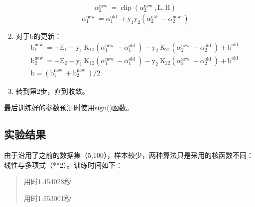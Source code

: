\documentclass[UTF8,a4paper,AutoFakeBold,AutoFakeSlant]{article}
\begin{document}
\begin{enumerate}
\begin{equation*}
\begin{array}{c}
      \alpha_{2}^{\text {new }}=\operatorname{clip}\left(\alpha_{2}^{\text {new }}, \mathrm{L}, \mathrm{H}\right)
      \end{array}
  \end{equation*}
  \begin{equation*}
    \alpha_{1}^{\text {new }}=\alpha_{1}^{\text {old }}+\mathrm{y}_{1} \mathrm{y}_{2}\left(\alpha_{2}^{\text {old }}-\alpha_{2}^{\text {new }}\right)
  \end{equation*}
  \item 对于b的更新：
  \begin{equation*}
    \begin{array}{c}
      \mathrm{b}_{1}^{\text {new }}=-\mathrm{E}_{1}-\mathrm{y}_{1} \mathrm{~K}_{11}\left(\alpha_{1}^{\text {new }}-\alpha_{1}^{\text {old }}\right)-\mathrm{y}_{2} \mathrm{~K}_{21}\left(\alpha_{2}^{\text {new }}-\alpha_{2}^{\text {old }}\right)+\mathrm{b}^{\text {old }} \\
      \mathrm{b}_{2}^{\text {new }}=-\mathrm{E}_{2}-\mathrm{y}_{1} \mathrm{~K}_{12}\left(\alpha_{1}^{\text {new }}-\alpha_{1}^{\text {old }}\right)-\mathrm{y}_{2} \mathrm{~K}_{22}\left(\alpha_{2}^{\text {new }}-\alpha_{2}^{\text {old }}\right)+\mathrm{b}^{\text {old }} \\
      \mathrm{b}=\left(\mathrm{b}_{1}^{\text {new }}+\mathrm{b}_{2}^{\text {new }}\right) / 2
      \end{array}
  \end{equation*}
  \item 转到第2步，直到收敛。
\end{enumerate}

最后训练好的参数预测时使用sign()函数。



\subsection{实验结果}

由于沿用了之前的数据集（5,100），样本较少，两种算法只是采用的核函数不同：线性与多项式（**2）。训练时间如下：
\begin{quotation}
  用时1.454028秒

  用时1.553001秒
\end{quotation}
\end{document}
